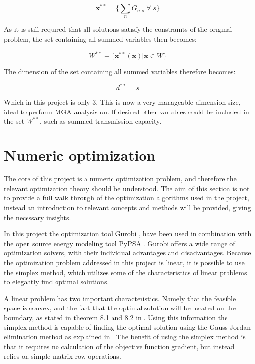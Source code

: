 \begin{equation}\label{eq:Optimization_variables_3}
\mathbf{x}^{**} = \{  \sum_n G_{n,s} \; \forall \; s \}
\end{equation}

As it is still required that all solutions satisfy the constraints of the original problem, the set containing all summed variables then becomes: 

\begin{equation}
W^{**} = \{ \mathbf{x}^{**}(\mathbf{x})  | \mathbf{x} \in W \}
\end{equation}

The dimension of the set containing all summed variables therefore becomes: 

\begin{equation} \label{eq:dim_d**}
d^{**} = s
\end{equation}

Which in this project is only $3$. This is now a very manageable dimension size, ideal to perform MGA analysis on. If desired other variables could be included in the set $W^{**}$, such as summed transmission capacity. 


\section{Numeric optimization}
The core of this project is a numeric optimization problem, and therefore the relevant optimization theory should be understood. The aim of this section is not to provide a full walk through of the optimization algorithms used in the project, instead an introduction to relevant concepts and methods will be provided, giving the necessary insights. 

In this project the optimization tool Gurobi \cite{Gurobi}, have been used in combination with the open source energy modeling tool PyPSA \cite{Pypsa}. Gurobi offers a wide range of optimization solvers, with their individual advantages and disadvantages. Because the optimization problem addressed in this project is linear, it is possible to use the simplex method, which utilizes some of the characteristics of linear problems to elegantly find optimal solutions. 

A linear problem has two important characteristics. Namely that the feasible space is convex, and the fact that the optimal solution will be located on the boundary, as stated in theorem 8.1 and 8.2 in \cite{OpimizationIntroduction}. Using this information the simplex method is capable of finding the optimal solution using the Gauss-Jordan elimination method as explained in \cite{OpimizationIntroduction}. The benefit of using the simplex method is that it requires no calculation of the objective function gradient, but instead relies on simple matrix row operations. 

